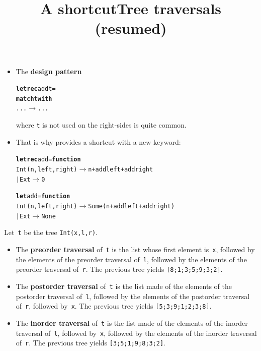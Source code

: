 \documentclass[wide]{slides}
\begin{document}
\begin{slide}
  \title{A shortcut}

  \begin{itemize}

  \item The \textbf{design pattern}
\begin{alltt}
\textbf{let rec} add t =
  \textbf{match} t \textbf{with}
     ... \(\rightarrow\) ...
\end{alltt}
      where \texttt{t} is not used on the right\hyp{}sides is quite
      common.

    \item That is why \OCaml provides a shortcut with a new keyword:
      \smallskip
\begin{alltt}
\textbf{let rec} add = \textbf{function}
  Int (n,left,right) \(\rightarrow\) n + add left + add right
| Ext \(\rightarrow\) 0

\textbf{let} add = \textbf{function}
  Int (n,left,right) \(\rightarrow\) Some (n + add left + add right)
| Ext \(\rightarrow\) None
\end{alltt}

  \end{itemize}

\end{slide}

\begin{slide}
  \title{Tree traversals (resumed)}

  Let~\texttt{t} be the tree \texttt{Int(x,l,r)}.
  \begin{itemize}

    \item The \textbf{preorder traversal} of~\texttt{t} is the list
      whose first element is~\texttt{x}, followed by the elements of
      the preorder traversal of~\texttt{l}, followed by the elements
      of the preorder traversal of~\texttt{r}. The previous tree
      yields \texttt{[8;1;3;5;9;3;2]}.

    \item The \textbf{postorder traversal} of~\texttt{t} is the list
      made of the elements of the postorder traversal of~\texttt{l},
      followed by the elements of the postorder traversal
      of~\texttt{r}, followed by~\texttt{x}. The previous tree yields
      \texttt{[5;3;9;1;2;3;8]}.

    \item The \textbf{inorder traversal} of~\texttt{t} is the list
      made of the elements of the inorder traversal of~\texttt{l},
      followed by~\texttt{x}, followed by the elements of the inorder
      traversal of~\texttt{r}. The previous tree yields
      \texttt{[3;5;1;9;8;3;2]}.

  \end{itemize}

\end{slide}
\end{document}
